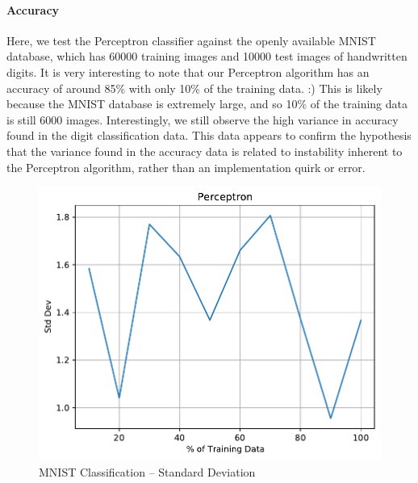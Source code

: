 \documentclass{article}
\begin{document}
  \paragraph{Accuracy}
  Here, we test the Perceptron classifier against the openly available MNIST database, which has 60000 training images and 10000 test images of handwritten digits.
  It is very interesting to note that our Perceptron algorithm has an accuracy of around 85\% with only 10\% of the training data. :)
  This is likely because the MNIST database is extremely large, and so 10\% of the training data is still 6000 images.
  Interestingly, we still observe the high variance in accuracy found in the digit classification data.
  This data appears to confirm the hypothesis that the variance found in the accuracy data is related to instability inherent to the Perceptron algorithm, rather than an implementation quirk or error.
  \begin{figure}[H]
  \includegraphics[width=\linewidth]{figures/Perceptron_stddev_MNIST.pdf}\hfill
  \caption{MNIST Classification -- Standard Deviation}
  \end{figure}
\end{document}
